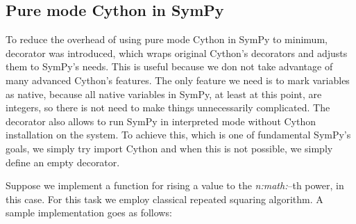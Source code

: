 \subsection{Pure mode Cython in SymPy}

To reduce the overhead of using pure mode Cython in SymPy to minimum,  decorator
was introduced, which wraps original Cython's decorators and adjusts them to SymPy's needs. This
is useful because we don not take advantage of many advanced Cython's features. The only feature
we need is to mark variables as native, because all native variables in SymPy, at least at this
point, are integers, so there is not need to make things unnecessarily complicated. The decorator
also allows to run SymPy in interpreted mode without Cython installation on the system. To achieve
this, which is one of fundamental SymPy's goals, we simply try import Cython and when this is not
possible, we simply define an empty decorator.

Suppose we implement a function for rising a value to the \emph{n:math:}--th power,  in this case.
For this task we employ classical repeated squaring algorithm. A sample implementation goes as follows:


